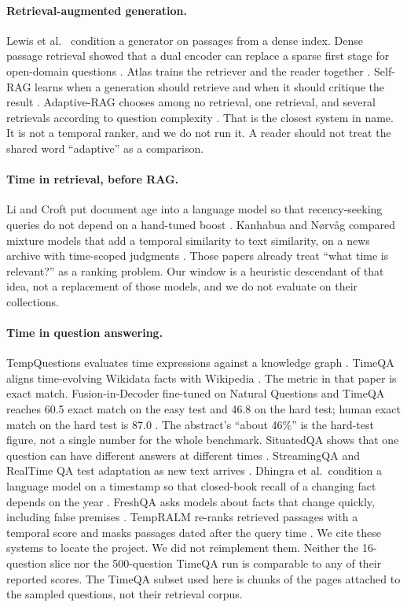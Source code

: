 \documentclass[11pt,letterpaper]{article}
\begin{document}
\paragraph{Retrieval-augmented generation.}
Lewis et al.\ \cite{lewis2020rag} condition a generator on passages from a dense index.
Dense passage retrieval showed that a dual encoder can replace a sparse first stage for open-domain questions \cite{karpukhin2020dpr}.
Atlas trains the retriever and the reader together \cite{izacard2023atlas}.
Self-RAG learns when a generation should retrieve and when it should critique the result \cite{asai2024selfrag}.
Adaptive-RAG chooses among no retrieval, one retrieval, and several retrievals according to question complexity \cite{jeong2024adaptiverag}.
That is the closest system in name.
It is not a temporal ranker, and we do not run it.
A reader should not treat the shared word ``adaptive'' as a comparison.

\paragraph{Time in retrieval, before RAG.}
Li and Croft put document age into a language model so that recency-seeking queries do not depend on a hand-tuned boost \cite{li2003time}.
Kanhabua and N{\o}rv{\aa}g compared mixture models that add a temporal similarity to text similarity, on a news archive with time-scoped judgments \cite{kanhabua2011ranking}.
Those papers already treat ``what time is relevant?'' as a ranking problem.
Our window is a heuristic descendant of that idea, not a replacement of those models, and we do not evaluate on their collections.

\paragraph{Time in question answering.}
TempQuestions evaluates time expressions against a knowledge graph \cite{jia2018tempquestions}.
TimeQA aligns time-evolving Wikidata facts with Wikipedia \cite{chen2021timeqa}.
The metric in that paper is exact match.
Fusion-in-Decoder fine-tuned on Natural Questions and TimeQA reaches 60.5 exact match on the easy test and 46.8 on the hard test; human exact match on the hard test is 87.0 \cite{chen2021timeqa}.
The abstract's ``about 46\%'' is the hard-test figure, not a single number for the whole benchmark.
SituatedQA shows that one question can have different answers at different times \cite{zhang2021situatedqa}.
StreamingQA and RealTime QA test adaptation as new text arrives \cite{liska2022streamingqa,kasai2023realtimeqa}.
Dhingra et al.\ condition a language model on a timestamp so that closed-book recall of a changing fact depends on the year \cite{dhingra2022talm}.
FreshQA asks models about facts that change quickly, including false premises \cite{vu2023freshqa}.
TempRALM re-ranks retrieved passages with a temporal score and masks passages dated after the query time \cite{gade2024tempralm}.
We cite these systems to locate the project.
We did not reimplement them.
Neither the 16-question slice nor the 500-question TimeQA run is comparable to any of their reported scores.
The TimeQA subset used here is chunks of the pages attached to the sampled questions, not their retrieval corpus.
\end{document}
